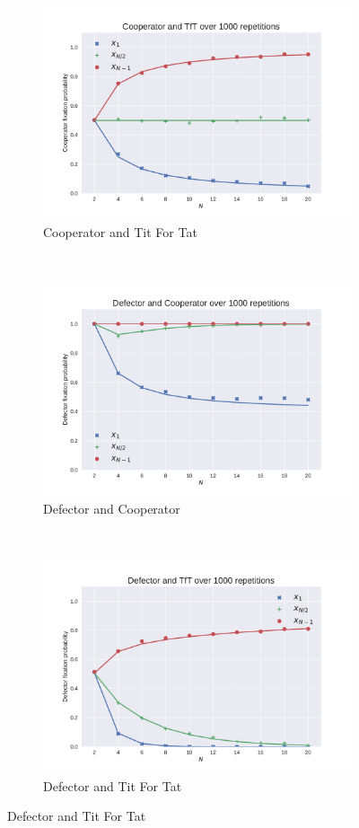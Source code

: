 \documentclass{article}
\begin{document}
\begin{figure}[!hbtp]
    \begin{subfigure}[t]{.3\textwidth}
        \centering
        \includegraphics[width=.8\textwidth]{./img/Cooperator_v_TfT.pdf}
        \caption{Cooperator and Tit For Tat}
    \end{subfigure}%
    ~
    \begin{subfigure}[t]{.3\textwidth}
        \centering
        \includegraphics[width=.8\textwidth]{./img/Defector_v_Cooperator.pdf}
        \caption{Defector and Cooperator}
    \end{subfigure}%
    ~
    \begin{subfigure}[t]{.3\textwidth}
        \centering
        \includegraphics[width=.8\textwidth]{./img/Defector_v_TfT.pdf}
        \caption{Defector and Tit For Tat}
    \end{subfigure}%


\end{figure}
\end{document}

